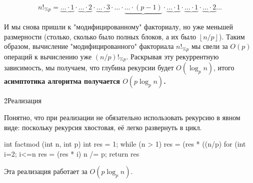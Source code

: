 $$ n!_{\%p} = \underbrace{ \ldots \cdot 1 } \cdot \underbrace{ \ldots \cdot 2 } \cdot \underbrace{ \ldots \cdot 3 } \cdot \ldots \cdot \underbrace{ \ldots \cdot (p-1) } \cdot \underbrace{ \ldots \cdot 1 } \cdot \underbrace{ \ldots \cdot 1 } \cdot \underbrace{ \ldots \cdot 2 } \ldots $$

И мы снова пришли к "модифицированному" факториалу, но уже меньшей размерности (столько, сколько было полных блоков, а их было $\left\lfloor n / p \right\rfloor$). Таким образом, вычисление "модифицированного" факториала $n!_{\%p}$ мы свели за $O(p)$ операций к вычислению уже $(n/p)!_{\%p}$. Раскрывая эту рекуррентную зависимость, мы получаем, что глубина рекурсии будет $O (\log_p n)$, итого \bf{асимптотика} алгоритма получается $O(p \log_p n)$.

\h2{Реализация}

Понятно, что при реализации не обязательно использовать рекурсию в явном виде: поскольку рекурсия хвостовая, её легко развернуть в цикл.

\code
int factmod (int n, int p) {
	int res = 1;
	while (n > 1) {
		res = (res * ((n/p) %
		for (int i=2; i<=n%
			res = (res * i) %
		n /= p;
	}
	return res %
}
\endcode

Эта реализация работает за $O(p \log_p n)$.